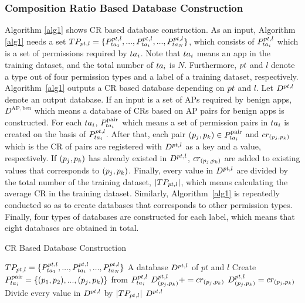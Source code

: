 \documentclass{ieeeaccess}
\begin{document}
\subsubsection{Composition Ratio Based Database Construction}
Algorithm \ref{alg1} shows CR based database construction.
As an input, Algorithm \ref{alg1} needs a set $TP_{pt, l} = \{P^{pt, l}_{ta_{1}}, ..., P^{pt, l}_{ta_{i}}, ..., P^{pt, l}_{ta_{N}}\}$, which consists of $P^{pt, l}_{ta_{i}}$ which is a set of permissions required by $ta_{i}$.  
Note that $ta_{i}$ means an app in the training dataset, and the total number of $ta_{i}$ is $N$.
Furthermore, $pt$ and $l$ denote a type out of four permission types and a label of a training dataset, respectively.
Algorithm~\ref{alg1} outputs a CR based database depending on $pt$ and $l$.
Let $D^{pt, l}$ denote an output database.
If an input is a set of APs required by benign apps, $D^{\mathrm{AP, ben}}$ which means a database of CRs based on AP pairs for benign apps is constructed.
For each $ta_{i}$, $P^{\mathrm{pair}}_{ta_{i}}$ which means a set of permission pairs in $ta_{i}$ is created on the basis of $P^{pt, l}_{ta_{i}}$.
After that, each pair $(p_j, p_k) \in P^{\mathrm{pair}}_{ta_{i}}$ and $cr_{(p_j, p_k)}$ which is the CR of pairs are registered with $D^{pt, l}$ as a key and a value, respectively.
If $(p_j, p_k)$ has already existed in $D^{pt, l}$, $cr_{(p_j, p_k)}$ are added to existing values that corresponds to $(p_j, p_k)$.
Finally, every value in $D^{pt, l}$ are divided by the total number of the training dataset, $|TP_{pt, l}|$, which means calculating the average CR in the training dataset.
Similarly, Algorithm~\ref{alg1} is repeatedly conducted so as to create databases that corresponds to other permission types. 
Finally, four types of databases are constructed for each label, which means that eight databases are obtained in total.  
\begin{algorithm}[t]
  \caption{CR Based Database Construction}
  \label{alg1}
  \begin{algorithmic}[1]
    \Require $TP_{pt, l} = \{P^{pt, l}_{ta_{1}}, ..., P^{pt, l}_{ta_{i}}, ..., P^{pt, l}_{ta_{N}}\}$ 
    \Ensure A database $D^{pt, l}$ of $pt$ and $l$ %
    \State Create $P^{\mathrm{pair}}_{ta_{i}} = \{(p_1, p_2), ..., (p_j, p_k)\}$ from $P^{pt, l}_{ta_{i}}$ 
      \Else
      \EndIf
        \State $D^{pt, l}_{(p_j, p_k)} += cr_{(p_j, p_k)}$ 
      \Else
        \State $D^{pt, l}_{(p_j, p_k)} = cr_{(p_j, p_k)}$ 
      \EndIf
    \EndFor 
  \EndFor 
  \State Divide every value in $D^{pt, l}$ by $|TP_{pt, l}|$
  \State \Return $D^{pt, l}$
  \end{algorithmic}
\end{algorithm} 
\end{document}
